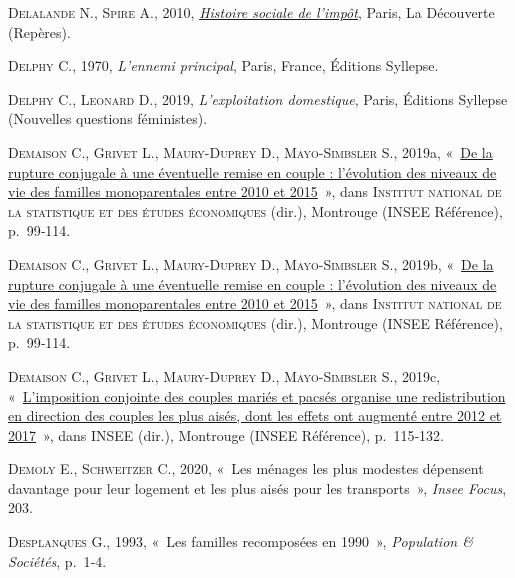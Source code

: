 \documentclass[
  12pt,
]{book}
\newlength{\cslhangindent}
\newenvironment{CSLReferences}[2] %
 {\begin{list}{}{%
  \setlength{\itemindent}{0pt}
  \setlength{\leftmargin}{0pt}
  \setlength{\parsep}{0pt}
  \ifodd #1
   \setlength{\leftmargin}{\cslhangindent}
   \setlength{\itemindent}{-1\cslhangindent}
  \fi
  \setlength{\itemsep}{#2\baselineskip}}}
 {\end{list}}
\begin{document}
\begin{CSLReferences}{0}{1}
\textsc{Delalande N.}, \textsc{Spire A.}, 2010,
\emph{\href{https://www.cairn.info/histoire-sociale-de-l-impot--9782707157164.htm}{Histoire
sociale de l{'}impôt}}, Paris, La Découverte (Repères).

\textsc{Delphy C.}, 1970, \emph{L'ennemi principal}, Paris, France,
Éditions Syllepse.

\textsc{Delphy C.}, \textsc{Leonard D.}, 2019, \emph{L'exploitation
domestique}, Paris, Éditions Syllepse (Nouvelles questions féministes).

\textsc{Demaison C.}, \textsc{Grivet L.}, \textsc{Maury-Duprey D.},
\textsc{Mayo-Simbsler S.}, 2019a,
{«~\href{https://www.insee.fr/fr/statistiques/4238781}{De la rupture
conjugale à une éventuelle remise en couple : l{'}évolution des niveaux
de vie des familles monoparentales entre 2010 et 2015}~»}, dans
\textsc{Institut national de la statistique et des études économiques}
(dir.), Montrouge (INSEE Référence), p.~99‑114.

\textsc{Demaison C.}, \textsc{Grivet L.}, \textsc{Maury-Duprey D.},
\textsc{Mayo-Simbsler S.}, 2019b,
{«~\href{https://www.insee.fr/fr/statistiques/4238781}{De la rupture
conjugale à une éventuelle remise en couple : l{'}évolution des niveaux
de vie des familles monoparentales entre 2010 et 2015}~»}, dans
\textsc{Institut national de la statistique et des études économiques}
(dir.), Montrouge (INSEE Référence), p.~99‑114.

\textsc{Demaison C.}, \textsc{Grivet L.}, \textsc{Maury-Duprey D.},
\textsc{Mayo-Simbsler S.}, 2019c,
{«~\href{https://www.insee.fr/fr/statistiques/4238781}{L{'}imposition
conjointe des couples mariés et pacsés organise une redistribution en
direction des couples les plus aisés, dont les effets ont augmenté entre
2012 et 2017}~»}, dans \textsc{INSEE} (dir.), Montrouge (INSEE
Référence), p.~115‑132.

\textsc{Demoly E.}, \textsc{Schweitzer C.}, 2020, {«~Les ménages les
plus modestes dépensent davantage pour leur logement et les plus aisés
pour les transports~»}, \emph{Insee Focus}, 203.

\textsc{Desplanques G.}, 1993, {«~Les familles recomposées en 1990~»},
\emph{Population \& Sociétés}, p.~1‑4.


\end{CSLReferences}
\end{document}
